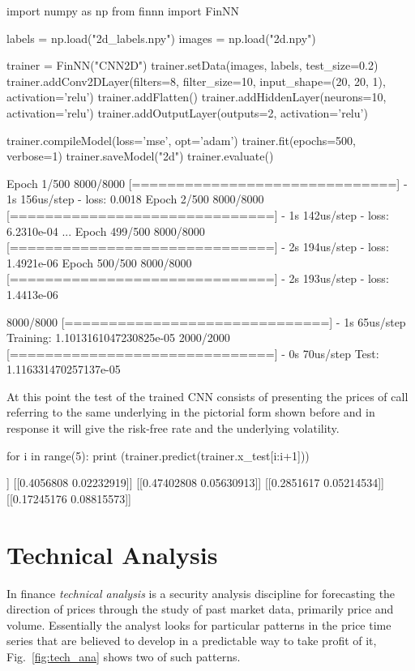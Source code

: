 \begin{ipython}
import numpy as np
from finnn import FinNN

labels = np.load("2d_labels.npy")
images = np.load("2d.npy")

trainer = FinNN("CNN2D")
trainer.setData(images, labels, test_size=0.2)
trainer.addConv2DLayer(filters=8, filter_size=10,
input_shape=(20, 20, 1), activation='relu')
trainer.addFlatten()
trainer.addHiddenLayer(neurons=10, activation='relu')
trainer.addOutputLayer(outputs=2, activation='relu')

trainer.compileModel(loss='mse', opt='adam')
trainer.fit(epochs=500, verbose=1)
trainer.saveModel("2d")
trainer.evaluate()
\end{ipython}
\begin{ioutput}
Epoch 1/500
8000/8000 [==============================] - 1s 156us/step - loss: 0.0018
Epoch 2/500
8000/8000 [==============================] - 1s 142us/step - loss: 6.2310e-04
...
Epoch 499/500
8000/8000 [==============================] - 2s 194us/step - loss: 1.4921e-06
Epoch 500/500
8000/8000 [==============================] - 2s 193us/step - loss: 1.4413e-06

8000/8000 [==============================] - 1s 65us/step
Training: 1.1013161047230825e-05
2000/2000 [==============================] - 0s 70us/step
Test: 1.116331470257137e-05
\end{ioutput}

At this point the test of the trained CNN consists of presenting the prices of call
referring to the same underlying in the pictorial form shown before and
in response it will give the risk-free rate and the underlying volatility.

\begin{ipython}
for i in range(5):
    print (trainer.predict(trainer.x_test[i:i+1]))
\end{ipython}
\begin{ioutput}
[[0.3825101  0.09229672]]
[[0.4056808  0.02232919]]
[[0.47402808 0.05630913]]
[[0.2851617  0.05214534]]
[[0.17245176 0.08815573]]
\end{ioutput}

\section{Technical Analysis}\label{technical-analysis}

In finance \emph{technical analysis} is a security analysis discipline
for forecasting the direction of prices through the study of past market
data, primarily price and volume. Essentially the analyst looks for
particular patterns in the price time series that are believed to
develop in a predictable way to take profit of it, Fig.~\ref{fig:tech_ana} shows two
of such patterns.

